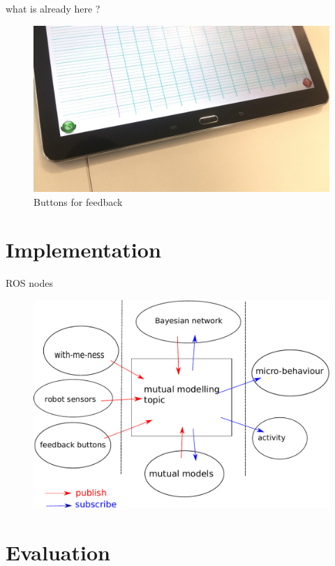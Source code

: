 \documentclass[compress]{beamer}
\begin{document}
\begin{frame}{what is already here ?}
    \begin{figure}
        \centering
        \includegraphics[width=0.9\columnwidth]{buttons.jpg}
        \caption{Buttons for feedback}
    \end{figure}
\end{frame}

\section{Implementation}

\begin{frame}{ROS nodes}
	\begin{figure}
        \centering
        \includegraphics[width=0.8\columnwidth]{ros}
    \end{figure}
\end{frame}

\section{Evaluation}
\end{document}
